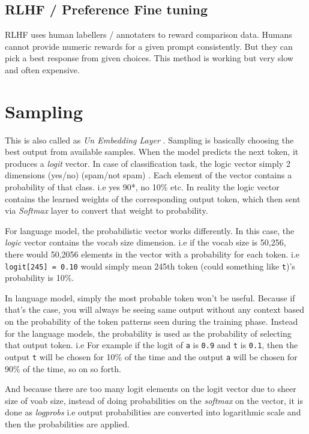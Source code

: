 \documentclass[
  letterpaper,
  DIV=11,
  numbers=noendperiod]{scrreprt}
\begin{document}
\subsection*{RLHF / Preference Fine
tuning}\label{rlhf-preference-fine-tuning}

RLHF uses human labellers / annotaters to reward comparison data. Humans
cannot provide numeric rewards for a given prompt consistently. But they
can pick a best response from given choices. This method is working but
very slow and often expensive.

\section*{Sampling}\label{sampling}


This is also called as \emph{Un Embedding Layer} . Sampling is basically
choosing the best output from available samples. When the model predicts
the next token, it produces a \emph{logit} vector. In case of
classification task, the logic vector simply 2 dimensions (yes/no)
(spam/not spam) . Each element of the vector contains a probability of
that class. i.e yes 90*, no 10\% etc. In reality the logic vector
contains the learned weights of the corresponding output token, which
then sent via \emph{Softmax} layer to convert that weight to
probability.

For language model, the probabilistic vector works differently. In this
case, the \emph{logic} vector contains the vocab size dimension. i.e if
the vocab size is 50,256, there would 50,2056 elements in the vector
with a probability for each token. i.e \texttt{logit{[}245{]}\ =\ 0.10}
would simply mean 245th token (could something like \texttt{t})'s
probability is 10\%.

In language model, simply the most probable token won't be useful.
Because if that's the case, you will always be seeing same output
without any context based on the probability of the token patterns seen
during the training phase. Instead for the language models, the
probability is used as the probability of selecting that output token.
i.e For example if the logit of \texttt{a} is \texttt{0.9} and
\texttt{t} is \texttt{0.1}, then the output \texttt{t} will be chosen
for 10\% of the time and the output \texttt{a} will be chosen for 90\%
of the time, so on so forth.

And because there are too many logit elements on the logit vector due to
sheer size of voab size, instead of doing probabilities on the
\emph{softmax} on the vector, it is done as \emph{logprobs} i.e output
probabilities are converted into logarithmic scale and then the
probabilities are applied.
\end{document}
